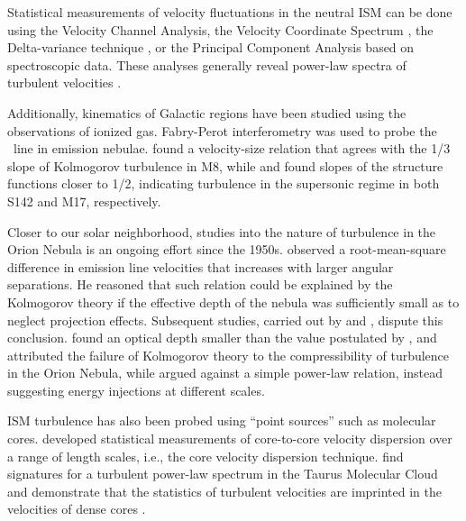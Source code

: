 Statistical measurements of velocity fluctuations in the neutral ISM can be done using the Velocity Channel Analysis, the Velocity Coordinate Spectrum \citep{lazarian_velocity_2000,lazarian_studying_2006}, the Delta-variance technique \citep{stutzki_fractal_1998,ossenkopf_turbulent_2002}, or the Principal Component Analysis \citep{heyer_universality_2004,roman-duval_turbulence_2011} based on spectroscopic data. These analyses generally reveal power-law spectra of turbulent velocities \citep{lazarian_obtaining_2009,chepurnov_velocity_2010}.

Additionally, kinematics of Galactic  regions have been studied using the observations of ionized gas. Fabry-Perot interferometry was used to probe the \halpha~line in emission nebulae. \citet[][]{louise_turbulence_1970} found a velocity-size relation that agrees with the 1/3 slope of Kolmogorov turbulence in M8, while \citet{roy_structure_1985} and \citet[][]{joncas_h_1986} found slopes of the structure functions closer to 1/2, indicating turbulence in the supersonic regime in both S142 and M17, respectively. 

Closer to our solar neighborhood, studies into the nature of turbulence in the Orion Nebula is an ongoing effort since the 1950s. \citet{von_hoerner_methode_1951} observed a root-mean-square difference in emission line velocities that increases with larger angular separations. He reasoned that such relation could be explained by the Kolmogorov theory if the effective depth of the nebula was sufficiently small as to neglect projection effects. Subsequent studies, carried out by \citet{munch_internal_1958} and \citet{castaneda_velocity_1988}, dispute this conclusion. \citet[][]{munch_internal_1958} found an optical depth smaller than the value postulated by \citet[][]{von_hoerner_methode_1951}, and attributed the failure of Kolmogorov theory to the compressibility of turbulence in the Orion Nebula, while \citet[][]{castaneda_velocity_1988} argued against a simple power-law relation, instead suggesting energy injections at different scales. 

ISM turbulence has also been probed using ``point sources'' such as molecular cores. \citet{qian_13co_2012} developed statistical measurements of core-to-core velocity dispersion over a range of length scales, i.e., the core velocity dispersion technique. \citet{qian_studies_2018} find signatures for a turbulent power-law spectrum in the Taurus Molecular Cloud and demonstrate that the statistics of turbulent velocities are imprinted in the velocities of dense cores \citep{xu_projected_2020}. 

